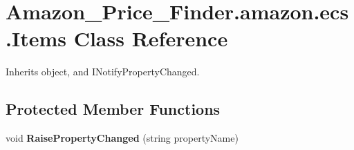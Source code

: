 \hypertarget{class_amazon___price___finder_1_1amazon_1_1ecs_1_1_items}{\section{Amazon\-\_\-\-Price\-\_\-\-Finder.\-amazon.\-ecs.\-Items Class Reference}
\label{class_amazon___price___finder_1_1amazon_1_1ecs_1_1_items}
}


 




Inherits object, and I\-Notify\-Property\-Changed.

\subsection*{Protected Member Functions}
\begin{DoxyCompactItemize}
\item 
\hypertarget{class_amazon___price___finder_1_1amazon_1_1ecs_1_1_items_a45e6bea9da4731996baa8ca8159db2f0}{void {\bfseries Raise\-Property\-Changed} (string property\-Name)}\label{class_amazon___price___finder_1_1amazon_1_1ecs_1_1_items_a45e6bea9da4731996baa8ca8159db2f0}

\end{DoxyCompactItemize}
